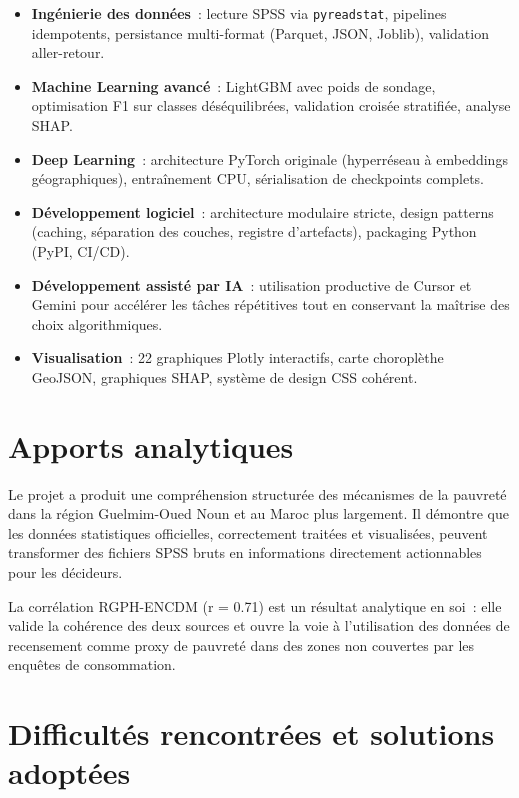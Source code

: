 \documentclass[12pt,a4paper]{report}
\begin{document}
\begin{itemize}
  \item \textbf{Ingénierie des données}~: lecture SPSS via \texttt{pyreadstat}, pipelines idempotents, persistance multi-format (Parquet, JSON, Joblib), validation aller-retour.
  \item \textbf{Machine Learning avancé}~: LightGBM avec poids de sondage, optimisation F1 sur classes déséquilibrées, validation croisée stratifiée, analyse SHAP.
  \item \textbf{Deep Learning}~: architecture PyTorch originale (hyperréseau à embeddings géographiques), entraînement CPU, sérialisation de checkpoints complets.
  \item \textbf{Développement logiciel}~: architecture modulaire stricte, design patterns (caching, séparation des couches, registre d'artefacts), packaging Python (PyPI, CI/CD).
  \item \textbf{Développement assisté par IA}~: utilisation productive de Cursor et Gemini pour accélérer les tâches répétitives tout en conservant la maîtrise des choix algorithmiques.
  \item \textbf{Visualisation}~: 22 graphiques Plotly interactifs, carte choroplèthe GeoJSON, graphiques SHAP, système de design CSS cohérent.
\end{itemize}

\section{Apports analytiques}

Le projet a produit une compréhension structurée des mécanismes de la pauvreté dans la région Guelmim-Oued Noun et au Maroc plus largement. Il démontre que les données statistiques officielles, correctement traitées et visualisées, peuvent transformer des fichiers SPSS bruts en informations directement actionnables pour les décideurs.

La corrélation RGPH-ENCDM (r = 0.71) est un résultat analytique en soi~: elle valide la cohérence des deux sources et ouvre la voie à l'utilisation des données de recensement comme proxy de pauvreté dans des zones non couvertes par les enquêtes de consommation.

\section{Difficultés rencontrées et solutions adoptées}
\end{document}
